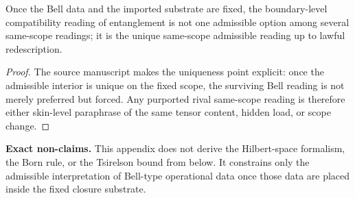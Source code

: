\begin{corollary}
Once the Bell data and the imported substrate are fixed, the boundary-level compatibility reading of entanglement is not one admissible option among several same-scope readings; it is the unique same-scope admissible reading up to lawful redescription.
\end{corollary}

\begin{proof}
The source manuscript makes the uniqueness point explicit: once the admissible interior is unique on the fixed scope, the surviving Bell reading is not merely preferred but forced. Any purported rival same-scope reading is therefore either skin-level paraphrase of the same tensor content, hidden load, or scope change.\cite{MaleyEntanglementBoundary}
\end{proof}

\begin{reviewbox}
\textbf{Exact non-claims.} This appendix does not derive the Hilbert-space formalism, the Born rule, or the Tsirelson bound from below. It constrains only the admissible interpretation of Bell-type operational data once those data are placed inside the fixed closure substrate.\cite{MaleyEntanglementBoundary}
\end{reviewbox}
